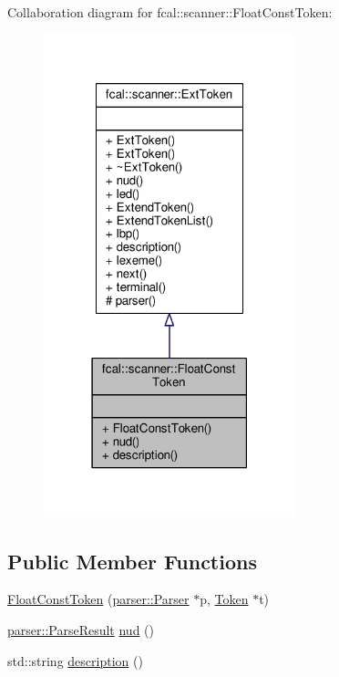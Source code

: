 Collaboration diagram for fcal\+:\+:scanner\+:\+:Float\+Const\+Token\+:
\nopagebreak
\begin{figure}[H]
\begin{center}
\leavevmode
\includegraphics[width=207pt]{classfcal_1_1scanner_1_1FloatConstToken__coll__graph}
\end{center}
\end{figure}
\subsection*{Public Member Functions}
\begin{DoxyCompactItemize}
\item 
\hyperlink{classfcal_1_1scanner_1_1FloatConstToken_a715ecedd2f42b7fbcfbf564dad7909fc}{Float\+Const\+Token} (\hyperlink{classfcal_1_1parser_1_1Parser}{parser\+::\+Parser} $\ast$p, \hyperlink{classfcal_1_1scanner_1_1Token}{Token} $\ast$t)
\item 
\hyperlink{classfcal_1_1parser_1_1ParseResult}{parser\+::\+Parse\+Result} \hyperlink{classfcal_1_1scanner_1_1FloatConstToken_a7ceca1dc6b064daf39e7250d8d93a9ce}{nud} ()
\item 
std\+::string \hyperlink{classfcal_1_1scanner_1_1FloatConstToken_ac98711e11205722a389fc19682183286}{description} ()
\end{DoxyCompactItemize}

